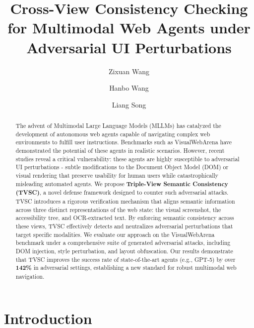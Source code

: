 \documentclass{llncs}
\begin{document}
\title{Cross-View Consistency Checking for Multimodal Web Agents under Adversarial UI Perturbations}
\author{Zixuan Wang \and Hanbo Wang \and Liang Song}

\maketitle

\begin{abstract}
The advent of Multimodal Large Language Models (MLLMs) has catalyzed the development of autonomous web agents capable of navigating complex web environments to fulfill user instructions. Benchmarks such as VisualWebArena have demonstrated the potential of these agents in realistic scenarios. However, recent studies reveal a critical vulnerability: these agents are highly susceptible to adversarial UI perturbations - subtle modifications to the Document Object Model (DOM) or visual rendering that preserve usability for human users while catastrophically misleading automated agents. We propose \textbf{Triple-View Semantic Consistency (TVSC)}, a novel defense framework designed to counter such adversarial attacks. TVSC introduces a rigorous verification mechanism that aligns semantic information across three distinct representations of the web state: the visual screenshot, the accessibility tree, and OCR-extracted text. By enforcing semantic consistency across these views, TVSC effectively detects and neutralizes adversarial perturbations that target specific modalities. We evaluate our approach on the VisualWebArena benchmark under a comprehensive suite of generated adversarial attacks, including DOM injection, style perturbation, and layout obfuscation. Our results demonstrate that TVSC improves the success rate of state-of-the-art agents (e.g., GPT-5) by over \textbf{142\%} in adversarial settings, establishing a new standard for robust multimodal web navigation.

\end{abstract}

\section{Introduction}
\end{document}
